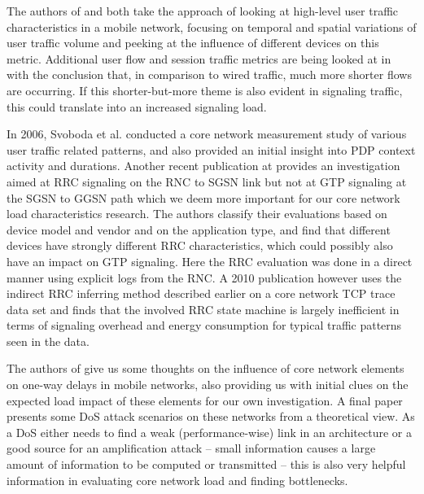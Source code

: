 The authors of \cite{shafiq2011characterizing} and \cite{paul2011understanding} both take the approach of looking at high-level user traffic characteristics in a mobile network, focusing on temporal and spatial variations of user traffic volume and peeking at the influence of different devices on this metric. Additional user flow and session traffic metrics are being looked at in \cite{Zhang:2012:UCC:2377677.2377764} with the conclusion that, in comparison to wired traffic, much more shorter flows are occurring. If this shorter-but-more theme is also evident in signaling traffic, this could translate into an increased signaling load.

In 2006, Svoboda et al. \cite{svoboda2006composition} conducted a core network measurement study of various user traffic related patterns, and also provided an initial insight into \ac{PDP} context activity and durations. Another recent publication at \cite{he2012panoramic} provides an investigation aimed at \ac{RRC} signaling on the \ac{RNC} to \ac{SGSN} link but not at \ac{GTP} signaling at the \ac{SGSN} to \ac{GGSN} path which we deem more important for our core network load characteristics research. The authors classify their evaluations based on device model and vendor and on the application type, and find that different devices have strongly different \ac{RRC} characteristics, which could possibly also have an impact on \ac{GTP} signaling. Here the \ac{RRC} evaluation was done in a direct manner using explicit logs from the \ac{RNC}. A 2010 publication\cite{Qian:2010:CRR:1879141.1879159} however uses the indirect \ac{RRC} inferring method described earlier on a core network TCP trace data set and finds that the involved \ac{RRC} state machine is largely inefficient in terms of signaling overhead and energy consumption for typical traffic patterns seen in the data.

The authors of \cite{4675847} give us some thoughts on the influence of core network elements on one-way delays in mobile networks, also providing us with initial clues on the expected load impact of these elements for our own investigation. A final paper \cite{Ricciato2010551} presents some \ac{DoS} attack scenarios on these networks from a theoretical view. As a \ac{DoS} either needs to find a weak (performance-wise) link in an architecture or a good source for an amplification attack -- small information causes a large amount of information to be computed or transmitted -- this is also very helpful information in evaluating core network load and finding bottlenecks.

